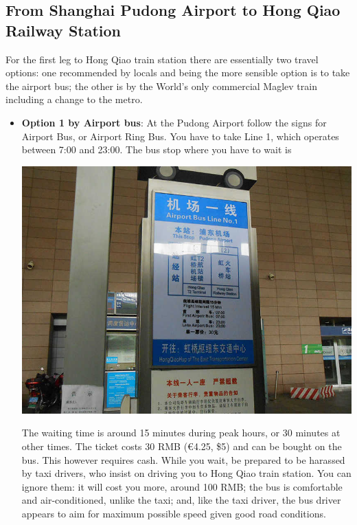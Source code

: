 \documentclass[11pt]{report}
\begin{document}
\subsection*{From Shanghai Pudong Airport to Hong Qiao Railway Station}

For the first leg to Hong Qiao train station there are
essentially two travel options: one recommended by locals
and being the more sensible option is to take the airport bus;
the other is by the World's only commercial Maglev train 
including a change to the metro. 

\begin{itemize}
\item \textbf{Option 1 by Airport bus}: 
At the Pudong Airport follow the signs for Airport Bus, or
Airport Ring Bus. You have to take Line 1, which operates
between 7:00 and 23:00. The bus stop where you have to wait is 

\begin{center}
\includegraphics[scale=0.9]{travel_guide/image005.jpg}
\end{center}

The waiting time is around 15 minutes during peak hours, or 30
minutes at other times. The ticket costs 30 RMB (\euro{}4.25,
\$5) and can be bought on the bus. This however requires cash.
While you wait, be prepared to be harassed by taxi drivers,
who insist on driving you to Hong Qiao train station. You can
ignore them: it will cost you more, around 100 RMB; the bus is
comfortable and air-conditioned, unlike the taxi; and, like
the taxi driver, the bus driver appears to aim for maximum
possible speed given good road conditions. 



\end{itemize}
\end{document}

